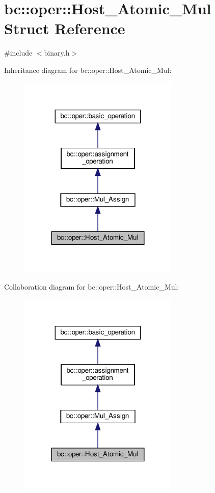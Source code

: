 \hypertarget{structbc_1_1oper_1_1Host__Atomic__Mul}{}\section{bc\+:\+:oper\+:\+:Host\+\_\+\+Atomic\+\_\+\+Mul Struct Reference}
\label{structbc_1_1oper_1_1Host__Atomic__Mul}


{\ttfamily \#include $<$binary.\+h$>$}



Inheritance diagram for bc\+:\+:oper\+:\+:Host\+\_\+\+Atomic\+\_\+\+Mul\+:\nopagebreak
\begin{figure}[H]
\begin{center}
\leavevmode
\includegraphics[width=216pt]{structbc_1_1oper_1_1Host__Atomic__Mul__inherit__graph}
\end{center}
\end{figure}


Collaboration diagram for bc\+:\+:oper\+:\+:Host\+\_\+\+Atomic\+\_\+\+Mul\+:\nopagebreak
\begin{figure}[H]
\begin{center}
\leavevmode
\includegraphics[width=216pt]{structbc_1_1oper_1_1Host__Atomic__Mul__coll__graph}
\end{center}
\end{figure}
